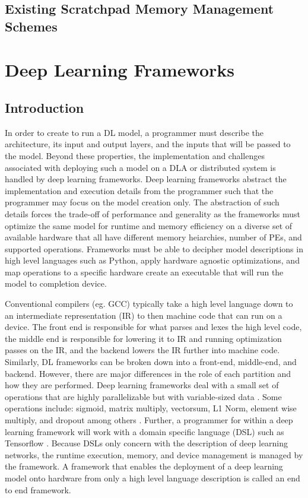 \subsection{Existing Scratchpad Memory Management Schemes}

\section{Deep Learning Frameworks}
\subsection{Introduction}
In order to create to run a DL model, a programmer must describe the
architecture, its input and output layers, and the inputs that will be passed
to the model. Beyond these properties, the implementation and challenges
associated with deploying such a model on a DLA or distributed system is
handled by deep learning frameworks. Deep learning frameworks abstract the
implementation and execution details from the programmer such that the
programmer may focus on the model creation only. The abstraction of such
details forces the trade-off of performance and generality as the frameworks
must optimize the same model for runtime and memory efficiency on a diverse set
of available hardware that all have different memory heiarchies, number of PEs,
and supported operations. Frameworks must be able to decipher model
descriptions in high level languages such as Python, apply hardware agnostic
optimizations, and map operations to a specific hardware create an executable
that will run the model to completion device.

Conventional compilers (eg. GCC) typically take a high level language down to
an intermediate representation (IR) to then machine code that can run on a
device.  The front end is responsible for what parses and lexes the high level
code, the middle end is responsible for lowering it to IR and running
optimization passes on the IR, and the backend lowers the IR further into
machine code. Similarly, DL frameworks can be broken down into a front-end,
middle-end, and backend. However, there are major differences in the role of
each partition and how they are performed.  Deep learning frameworks deal with
a small set of operations that are highly parallelizable but with
variable-sized data \cite{nGraph}. Some operations include: sigmoid, matrix
multiply, vectorsum, L1 Norm, element wise multiply, and dropout among others
\cite{cntk}. Further, a programmer for within a deep learning framework will
work with a domain specific language (DSL) such as Tensorflow
\cite{tensorflow}. Because DSLs only concern with the description of deep
learning networks, the runtime execution, memory, and device management is
managed by the framework. A framework that enables the deployment of a deep
learning model onto hardware from only a high level language description is
called an end to end framework.

